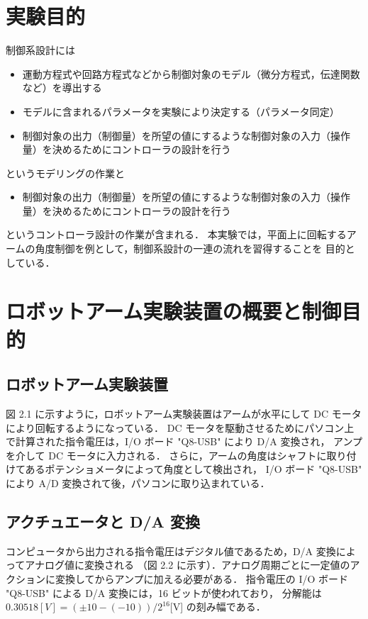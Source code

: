 
\section{実験目的}
制御系設計には
\begin{itemize}
  \item 運動方程式や回路方程式などから制御対象のモデル（微分方程式，伝達関数など）を導出する
  \item モデルに含まれるパラメータを実験により決定する（パラメータ同定）
  \item 制御対象の出力（制御量）を所望の値にするような制御対象の入力（操作量）を決めるためにコントローラの設計を行う
\end{itemize}
というモデリングの作業と
\begin{itemize}
  \item 制御対象の出力（制御量）を所望の値にするような制御対象の入力（操作量）を決めるためにコントローラの設計を行う
\end{itemize}
というコントローラ設計の作業が含まれる．
本実験では，平面上に回転するアームの角度制御を例として，制御系設計の一連の流れを習得することを
目的としている．

\section{ロボットアーム実験装置の概要と制御目的}

\subsection{ロボットアーム実験装置}

図 2.1 に示すように，ロボットアーム実験装置はアームが水平にして DC モータにより回転するようになっている．
DC モータを駆動させるためにパソコン上で計算された指令電圧は，I/O ボード "Q8-USB" により D/A 変換され，
アンプを介して DC モータに入力される．
さらに，アームの角度はシャフトに取り付けてあるポテンショメータによって角度として検出され，
I/O ボード "Q8-USB" により A/D 変換されて後，パソコンに取り込まれている．

\subsection{アクチュエータと D/A 変換}

コンピュータから出力される指令電圧はデジタル値であるため，D/A 変換によってアナログ値に変換される
（図 2.2 に示す）．アナログ周期ごとに一定値のアクションに変換してからアンプに加える必要がある．
指令電圧の I/O ボード "Q8-USB" による D/A 変換には，16 ビットが使われており，
分解能は \(0.30518 [V] = (\pm 10 - (-10))/2^{16} \)[V] の刻み幅である．

